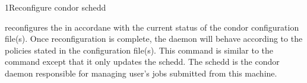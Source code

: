 \begin{ManPage}{}{1}{Reconfigure condor schedd}
\label{man-condor-reconfig}
\Synopsis {}

\Description 

 reconfigures the  in accordane with 
the current
status of the condor configuration file(s).  Once reconfiguration is complete,
the daemon will behave according to the policies stated in the configuration
file(s).  This command is similar to the  command except that
it only updates the schedd.  The schedd is the condor daemon responsible for
managing user's jobs submitted from this machine.  


\begin{Options}
\end{Options}

\end{ManPage}
